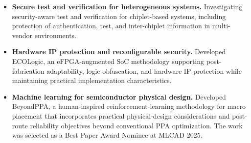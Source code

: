 \documentclass[11pt,letterpaper]{article}
\begin{document}
\begin{itemize}
  physically unclonable functions, distributed trust, and interposer-resident security mechanisms.
  \item \textbf{Secure test and verification for heterogeneous systems.}
  Investigating security-aware test and verification for chiplet-based systems, including protection
  of authentication, test, and inter-chiplet information in multi-vendor environments.
  \item \textbf{Hardware IP protection and reconfigurable security.}
  Developed ECOLogic, an eFPGA-augmented SoC methodology supporting post-fabrication adaptability,
  logic obfuscation, and hardware IP protection while maintaining practical implementation
  characteristics.
  \item \textbf{Machine learning for semiconductor physical design.}
  Developed BeyondPPA, a human-inspired reinforcement-learning methodology for macro placement that
  incorporates practical physical-design considerations and post-route reliability objectives beyond
  conventional PPA optimization. The work was selected as a Best Paper Award Nominee at MLCAD 2025.
\end{itemize}

\end{document}
